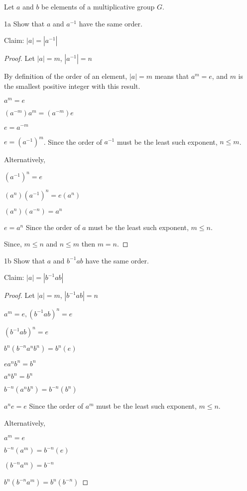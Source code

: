\begin{question}{1}
Let $a$ and $b$ be elements of a multiplicative group $G$.
\begin{question}{1a}
Show that $a$ and $a^{-1}$ have the same order.

Claim:
$|a| = |a^{-1}|$

\begin{proof}
Let $|a| = m$, $|a^{-1}| = n$

By definition of the order of an element, $|a| = m$ means that $a^m = e$, and $m$ is the smallest positive integer with this result. 

$a^m = e$

$(a^{-m})a^m = (a^{-m})e$

$e = a^{-m}$

$e = (a^{-1})^m$. Since the order of $a^{-1}$ must be the least such exponent, $n \leq m$. 

Alternatively, 

$(a^{-1})^n = e$

$(a^n)(a^{-1})^n = e(a^n)$

$(a^n)(a^{-n}) = a^n$

$e = a^n$ Since the order of $a$ must be the least such exponent, $m \leq n$.

Since, $m \leq n$ and $n \leq m$ then $m = n$.
\end{proof}
\end{question}

\begin{question}{1b} Show that $a$ and $b^{-1}ab$ have the same order.

Claim: $|a| = |b^{-1}ab|$
\begin{proof}
Let $|a|=m$, $|b^{-1}ab|=n$

$a^m = e, (b^{-1}ab)^n = e$

$(b^{-1}ab)^n = e$

$b^n(b^{-n} a^n b^n ) = b^n(e)$

$ea^n b^n = b^n$

$a^n b^n = b^n$

$b^{-n}(a^n b^n) = b^{-n}(b^n)$

$a^n e = e$ Since the order of $a^m$ must be the least such exponent, $m \leq n$.


Alternatively, 

$a^m = e$

$b^{-n}(a^m) = b^{-n}(e)$

$(b^{-n}a^m) = b^{-n}$

$b^n(b^{-n}a^m) = b^n(b^{-n})$


\end{proof}
\end{question}
\end{question}
